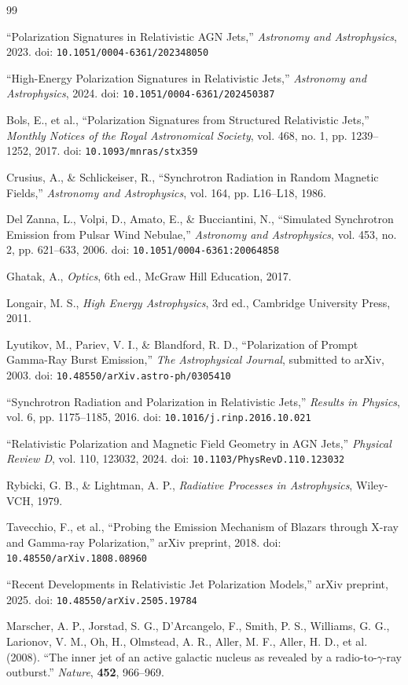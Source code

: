 \documentclass{article}
\begin{document}
\begin{thebibliography}{99}
``Polarization Signatures in Relativistic AGN Jets,''
\textit{Astronomy and Astrophysics},
2023.
doi: \texttt{10.1051/0004-6361/202348050}

``High-Energy Polarization Signatures in Relativistic Jets,''
\textit{Astronomy and Astrophysics},
2024.
doi: \texttt{10.1051/0004-6361/202450387}

Bols, E., et al.,
``Polarization Signatures from Structured Relativistic Jets,''
\textit{Monthly Notices of the Royal Astronomical Society},
vol. 468, no. 1, pp. 1239--1252, 2017.
doi: \texttt{10.1093/mnras/stx359}

Crusius, A., \& Schlickeiser, R.,
``Synchrotron Radiation in Random Magnetic Fields,''
\textit{Astronomy and Astrophysics},
vol. 164, pp. L16--L18, 1986.

Del Zanna, L., Volpi, D., Amato, E., \& Bucciantini, N.,
``Simulated Synchrotron Emission from Pulsar Wind Nebulae,''
\textit{Astronomy and Astrophysics},
vol. 453, no. 2, pp. 621--633, 2006.
doi: \texttt{10.1051/0004-6361:20064858}

Ghatak, A.,
\textit{Optics},
6th ed.,
McGraw Hill Education, 2017.

Longair, M. S.,
\textit{High Energy Astrophysics},
3rd ed.,
Cambridge University Press, 2011.

Lyutikov, M., Pariev, V. I., \& Blandford, R. D.,
``Polarization of Prompt Gamma-Ray Burst Emission,''
\textit{The Astrophysical Journal},
submitted to arXiv, 2003.
doi: \texttt{10.48550/arXiv.astro-ph/0305410}

``Synchrotron Radiation and Polarization in Relativistic Jets,''
\textit{Results in Physics},
vol. 6, pp. 1175--1185, 2016.
doi: \texttt{10.1016/j.rinp.2016.10.021}

``Relativistic Polarization and Magnetic Field Geometry in AGN Jets,''
\textit{Physical Review D},
vol. 110, 123032, 2024.
doi: \texttt{10.1103/PhysRevD.110.123032}

Rybicki, G. B., \& Lightman, A. P.,
\textit{Radiative Processes in Astrophysics},
Wiley-VCH, 1979.

Tavecchio, F., et al.,
``Probing the Emission Mechanism of Blazars through X-ray and Gamma-ray Polarization,''
arXiv preprint, 2018.
doi: \texttt{10.48550/arXiv.1808.08960}

``Recent Developments in Relativistic Jet Polarization Models,''
arXiv preprint, 2025.
doi: \texttt{10.48550/arXiv.2505.19784}

Marscher, A. P., Jorstad, S. G., D'Arcangelo, F., Smith, P. S., Williams, G. G., Larionov, V. M., Oh, H., Olmstead, A. R., Aller, M. F., Aller, H. D., et al. (2008). ``The inner jet of an active galactic nucleus as revealed by a radio-to-$\gamma$-ray outburst.'' \textit{Nature}, \textbf{452}, 966--969.

\end{thebibliography}
\end{document}
